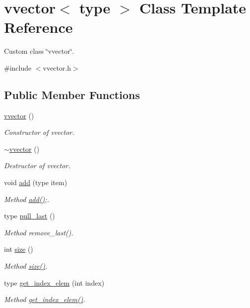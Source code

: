 \hypertarget{classvvector}{}\section{vvector$<$ type $>$ Class Template Reference}
\label{classvvector}


Custom class \char`\"{}vvector\char`\"{}.  




{\ttfamily \#include $<$vvector.\+h$>$}

\subsection*{Public Member Functions}
\begin{DoxyCompactItemize}
\item 
\hyperlink{classvvector_ab4b7e31d3baef30147eec4b80a13b26a}{vvector} ()
\begin{DoxyCompactList}\small\item\em Constructor of vvector. \end{DoxyCompactList}\item 
\hyperlink{classvvector_a01d5bcd372c6823a67add01d359dc8b3}{$\sim$vvector} ()
\begin{DoxyCompactList}\small\item\em Destructor of vvector. \end{DoxyCompactList}\item 
void \hyperlink{classvvector_a5c8078dbd30a0282fced5d7d252dac7f}{add} (type item)
\begin{DoxyCompactList}\small\item\em Method \hyperlink{classvvector_a5c8078dbd30a0282fced5d7d252dac7f}{add()};. \end{DoxyCompactList}\item 
type \hyperlink{classvvector_a1fbc380bcfd3b101886e571dbecf0c87}{pull\+\_\+last} ()
\begin{DoxyCompactList}\small\item\em Method remove\+\_\+last(). \end{DoxyCompactList}\item 
int \hyperlink{classvvector_ad7e9467e6de94a74f39a512a5ce9a08f}{size} ()
\begin{DoxyCompactList}\small\item\em Method \hyperlink{classvvector_ad7e9467e6de94a74f39a512a5ce9a08f}{size()}. \end{DoxyCompactList}\item 
type \hyperlink{classvvector_a6df759ba66353840d0b9f915a7c6338c}{get\+\_\+index\+\_\+elem} (int index)
\begin{DoxyCompactList}\small\item\em Method \hyperlink{classvvector_a6df759ba66353840d0b9f915a7c6338c}{get\+\_\+index\+\_\+elem()}. \end{DoxyCompactList}\end{DoxyCompactItemize}


